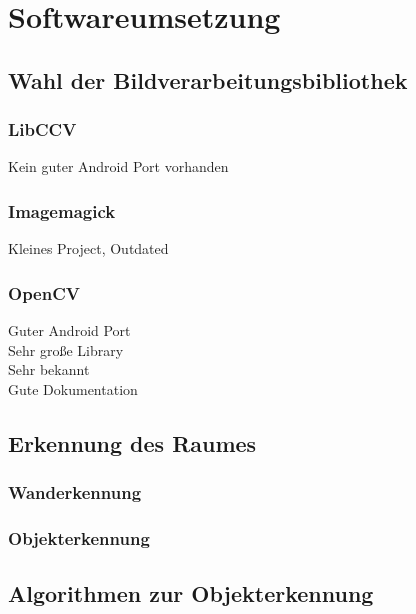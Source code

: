 \chapter{Softwareumsetzung}

\section{Wahl der Bildverarbeitungsbibliothek}
\subsection{LibCCV}
Kein guter Android Port vorhanden
\subsection{Imagemagick}
Kleines Project, Outdated
\subsection{OpenCV}
Guter Android Port\\
Sehr große Library\\
Sehr bekannt\\
Gute Dokumentation\\

\section{Erkennung des Raumes}
\subsection{Wanderkennung}
\subsection{Objekterkennung}

\section{Algorithmen zur Objekterkennung}
